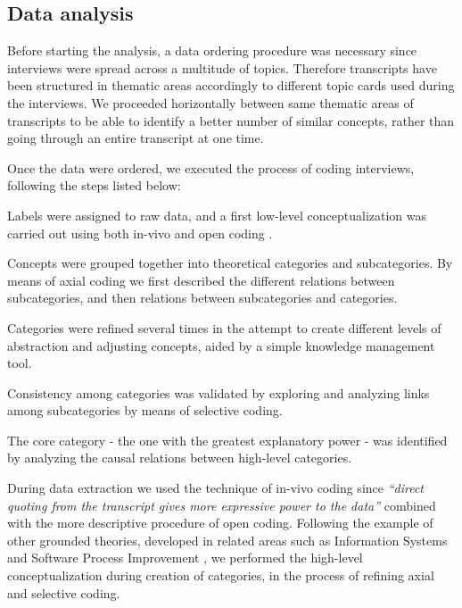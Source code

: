 \documentclass[10pt,journal,letterpaper,compsoc]{IEEEtran}
\begin{document}
\subsection{Data analysis}
Before starting the analysis, a data ordering procedure was necessary since 
interviews were spread across a multitude of topics. Therefore transcripts have 
been structured in thematic areas accordingly to different topic cards used 
during the interviews. We proceeded horizontally between same thematic areas of 
transcripts to be able to identify a better number of similar concepts, rather 
than going through an entire transcript at one time.

Once the data were ordered, we executed the process of coding interviews, 
following the steps listed below: 


\begin{compactitem}

\item Labels were assigned to raw data, and a first low-level conceptualization 
was carried out using both in-vivo and open coding \cite{ColinRobson2009}.
\item Concepts were grouped together into theoretical categories and 
subcategories. By means of axial coding we first described the different 
relations between subcategories, and then relations between subcategories and 
categories.
\item Categories were refined several times in the attempt to create different 
levels of abstraction and adjusting concepts, aided by a simple knowledge 
management tool.
\item Consistency among categories was validated by exploring and analyzing 
links among subcategories by means of selective coding.
\item The core category - the one with the greatest explanatory power - was 
identified by analyzing the causal relations between high-level categories.
\end{compactitem}


During data extraction we used the technique of in-vivo coding since 
\textit{``direct quoting from the transcript gives more expressive power to the 
data''} \cite{ColinRobson2009} combined with the more descriptive procedure of 
open coding. Following the example of other grounded theories, developed in 
related areas such as Information Systems \cite{Orlikowski1993} and Software 
Process Improvement \cite{Coleman2006}, we performed the high-level 
conceptualization during creation of categories, in the process of refining 
axial and selective coding.
\end{document}
